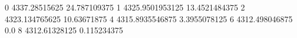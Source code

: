 0 4337.28515625 24.787109375
1 4325.9501953125 13.4521484375
2 4323.134765625 10.63671875
4 4315.8935546875 3.3955078125
6 4312.498046875 0.0
8 4312.61328125 0.115234375
